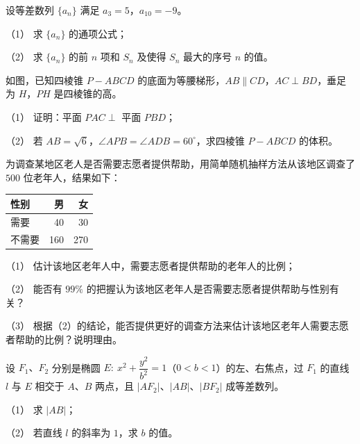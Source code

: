 \begin{question}
设等差数列 $\{a_n\}$ 满足 $a_3=5$，$a_{10}=-9$。

（1） 求 $\{a_n\}$ 的通项公式；

（2） 求 $\{a_n\}$ 的前 $n$ 项和 $S_n$ 及使得 $S_n$ 最大的序号 $n$ 的值。

\Needspace{0.4\textheight}
\end{question}
\begin{question}
如图，已知四棱锥 $P-ABCD$ 的底面为等腰梯形，$AB\parallel CD$，$AC\perp BD$，垂足为 $H$，$PH$ 是四棱锥的高。
\nopagebreak[4]
\begin{center}\end{center}
\nopagebreak[4]
（1） 证明：平面 $PAC\perp$ 平面 $PBD$；

（2） 若 $AB=\sqrt6$，$\angle APB=\angle ADB=60^\circ$，求四棱锥 $P-ABCD$ 的体积。

\end{question}
\begin{question}
为调查某地区老人是否需要志愿者提供帮助，用简单随机抽样方法从该地区调查了 $500$ 位老年人，结果如下：

\begin{center}
\begin{tabular}{lrr}
\toprule
性别 & 男 & 女 \\
\midrule
需要 & 40 & 30 \\
不需要 & 160 & 270 \\
\bottomrule
\end{tabular}
\end{center}

（1） 估计该地区老年人中，需要志愿者提供帮助的老年人的比例；

（2） 能否有 $99\%$ 的把握认为该地区老年人是否需要志愿者提供帮助与性别有关？

（3） 根据（2）的结论，能否提供更好的调查方法来估计该地区老年人需要志愿者帮助的比例？说明理由。

\end{question}
\begin{question}
设 $F_1\text{、}F_2$ 分别是椭圆 $E:\ x^2+\dfrac{y^2}{b^2}=1$（$0<b<1$）的左、右焦点，过 $F_1$ 的直线 $l$ 与 $E$ 相交于 $A\text{、}B$ 两点，且 $|AF_2|\text{、}|AB|\text{、}|BF_2|$ 成等差数列。

（1） 求 $|AB|$；

（2） 若直线 $l$ 的斜率为 $1$，求 $b$ 的值。

\end{question}
